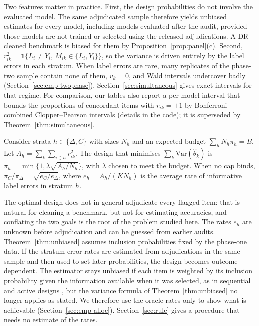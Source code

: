\documentclass[twoside,11pt]{article}
\newcommand{\1}{\mathbf{1}}
\newcommand{\Dset}{\Delta}
\newcommand{\Cset}{C}
\begin{document}
Two features matter in practice. First, the design probabilities do not involve the evaluated model. The same adjudicated sample therefore yields unbiased estimates for every model, including models evaluated after the audit, provided those models are not trained or selected using the released adjudications. A DR-cleaned benchmark is biased for them by Proposition~\ref{prop:panel}(c). Second, $r_{ik}^2=\1\{L_i\neq Y_i,\,M_{ik}\in\{L_i,Y_i\}\}$, so the variance is driven entirely by the label errors in each stratum. When label errors are rare, many replicates of the phase-two sample contain none of them, $\hat v_k=0$, and Wald intervals undercover badly (Section~\ref{sec:emp-twophase}). Section~\ref{sec:simultaneous} gives exact intervals for that regime. For comparison, our tables also report a per-model interval that bounds the proportions of concordant items with $r_{ik}=\pm1$ by Bonferroni-combined Clopper--Pearson intervals (details in the code); it is superseded by Theorem~\ref{thm:simultaneous}.

\begin{proposition}\label{prop:neyman}
Consider strata $h\in\{\Dset,\Cset\}$ with sizes $N_h$ and an expected budget $\sum_h N_h\pi_h=B$. Let $A_h=\sum_{k}\sum_{i\in h}r_{ik}^2$. The design that minimises $\sum_k\mathrm{Var}(\hat\theta_k)$ is $\pi_h=\min\{1,\lambda\sqrt{A_h/N_h}\}$, with $\lambda$ chosen to meet the budget. When no cap binds, $\pi_\Cset/\pi_\Dset=\sqrt{e_\Cset/e_\Dset}$, where $e_h=A_h/(K N_h)$ is the average rate of informative label errors in stratum $h$.
\end{proposition}

The optimal design does not in general adjudicate every flagged item: that is natural for cleaning a benchmark, but not for estimating accuracies, and conflating the two goals is the root of the problem studied here. The rates $e_h$ are unknown before adjudication and can be guessed from earlier audits. Theorem~\ref{thm:unbiased} assumes inclusion probabilities fixed by the phase-one data. If the stratum error rates are estimated from adjudications in the same sample and then used to set later probabilities, the design becomes outcome-dependent. The estimator stays unbiased if each item is weighted by its inclusion probability given the information available when it was selected, as in sequential and active designs \citep{zrnic2024active}, but the variance formula of Theorem~\ref{thm:unbiased} no longer applies as stated. We therefore use the oracle rates only to show what is achievable (Section~\ref{sec:emp-alloc}). Section~\ref{sec:rule} gives a procedure that needs no estimate of the rates.
\end{document}
